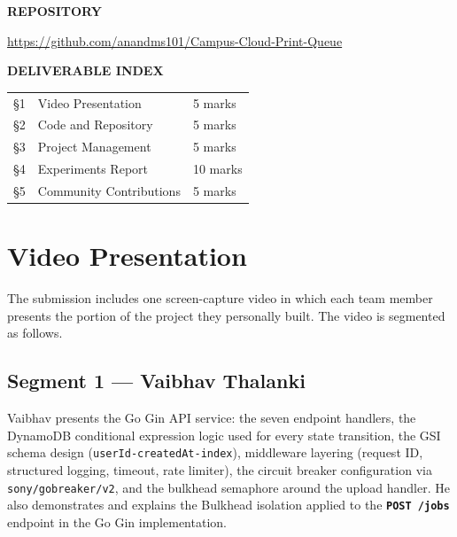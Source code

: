 \documentclass[11pt,letterpaper]{article}
\newcommand{\code}[1]{\texttt{\small #1}}
\newcommand{\http}[1]{\textbf{\texttt{#1}}}
\begin{document}
\begin{titlepage}
\begin{tcolorbox}[
  colback=surface,
  colframe=border,
  boxrule=0.8pt,
  arc=4pt,
  width=0.82\textwidth,
  left=14pt, right=14pt, top=8pt, bottom=8pt,
]
  {\small\bfseries\color{muted}\MakeUppercase{Repository}\par}
  \vspace{4pt}
  \url{https://github.com/anandms101/Campus-Cloud-Print-Queue}
\end{tcolorbox}

\vfill

\begin{tcolorbox}[
  colback=primary!5,
  colframe=primary!25,
  boxrule=0.6pt,
  arc=3pt,
  width=0.82\textwidth,
  left=12pt, right=12pt, top=7pt, bottom=7pt,
]
  {\small\bfseries\color{muted}\MakeUppercase{Deliverable Index}\par}
  \vspace{4pt}
  \begin{tabular}{@{}lll@{}}
    \S1 & Video Presentation      & 5 marks \\
    \S2 & Code and Repository     & 5 marks \\
    \S3 & Project Management      & 5 marks \\
    \S4 & Experiments Report      & 10 marks \\
    \S5 & Community Contributions & 5 marks \\
  \end{tabular}
\end{tcolorbox}
\end{titlepage}

\tableofcontents
\newpage

\section{Video Presentation}
\label{sec:video}

The submission includes one screen-capture video in which each team member presents the portion of the project they personally built. The video is segmented as follows.

\subsection{Segment 1 --- Vaibhav Thalanki}
Vaibhav presents the Go Gin API service: the seven endpoint handlers, the DynamoDB conditional expression logic used for every state transition, the GSI schema design (\code{userId-createdAt-index}), middleware layering (request ID, structured logging, timeout, rate limiter), the circuit breaker configuration via \code{sony/gobreaker/v2}, and the bulkhead semaphore around the upload handler. He also demonstrates and explains the Bulkhead isolation applied to the \http{POST /jobs} endpoint in the Go Gin implementation.
\end{document}

